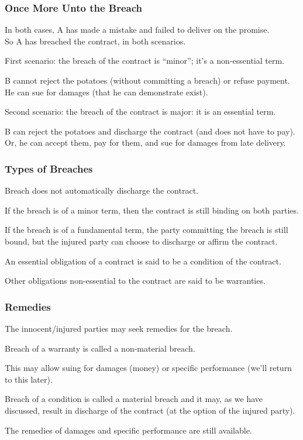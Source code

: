 \begin{frame}
\frametitle{Once More Unto the Breach}

In both cases, A has made a mistake and failed to deliver on the promise.\\
\quad So A has breached the contract, in both scenarios.

First scenario: the breach of the contract is ``minor''; it's a non-essential term.

B cannot reject the potatoes (without committing a breach) or refuse payment.\\
\quad He can sue for damages (that he can demonstrate exist).

Second scenario: the breach of the contract is major: it is an essential term.

B can reject the potatoes and discharge the contract (and does not have to pay).\\
\quad Or, he can accept them, pay for them, and sue for damages from late delivery.

\end{frame}



\begin{frame}
\frametitle{Types of Breaches}

Breach does not automatically discharge the contract.

If the breach is of a minor term, then the contract is still binding on both parties.

If the breach is of a fundamental term, the party committing the breach is still bound, but the injured party can choose to discharge or affirm the contract.

An essential obligation of a contract is said to be a \alert{condition} of the contract.

Other obligations non-essential to the contract are said to be \alert{warranties}.

\end{frame}




\begin{frame}
\frametitle{Remedies}

The innocent/injured parties may seek \alert{remedies} for the breach. 

Breach of a warranty is called a \alert{non-material breach}. 

This may allow suing for damages (money) or specific performance (we'll return to this later).

Breach of a condition is called a \alert{material breach} and it may, as we have discussed, result in discharge of the contract (at the option of the injured party).

The remedies of damages and specific performance are still available.

\end{frame}




